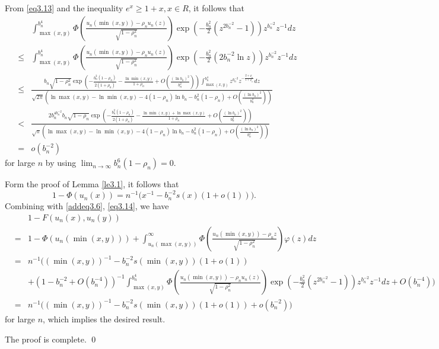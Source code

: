 \documentclass[10pt,twosided]{article}
\numberwithin{equation}{section}
\numberwithin{equation}{section}
\begin{document}
From \eqref{eq3.13} and the inequality $e^{x}\geq 1+x, x\in R$, it follows that
\begin{eqnarray}\label{eq3.14}
& & \int_{\max(x,y)}^{b_{n}^{4}} \Phi\left( \frac{u_{n}(\min(x,y))-\rho_{n}u_{n}(z)}{\sqrt{1-\rho_{n}^{2}}} \right)
\exp\left( -\frac{b_{n}^{2}}{2} (z^{2b_n^{-2}}-1)\right)z^{b_{n}^{-2}}z^{-1}dz \nonumber \\
&\leq& \int_{\max(x,y)}^{b_{n}^{4}} \Phi\left( \frac{u_{n}(\min(x,y))-\rho_{n}u_{n}(z)}{\sqrt{1-\rho_{n}^{2}}} \right)
\exp\left( -\frac{b_{n}^{2}}{2}(2b_{n}^{-2}\ln z) \right) z^{b_{n}^{-2}}z^{-1}dz\nonumber\\
&\le& \frac{b_{n}\sqrt{1-\rho_{n}^2}\exp\left(-\frac{b_n^2(1-\rho_n)}{2(1+\rho_n)} -\frac{\ln \min(x,y)}{1+\rho_n} +O\left( \frac{(\ln b_{n})^2}{b_{n}^2} \right) \right) \int_{\max(x,y)}^{b_{n}^{4}} z^{b_{n}^{-2}}z^{-\frac{2+\rho_{n}}{1+\rho_{n}}}dz}
{\sqrt{2\pi}\left(  \ln \max(x,y)-\ln \min(x,y) - 4(1-\rho_{n})\ln b_{n}
-b_{n}^2(1-\rho_{n}) + O\left( \frac{(\ln b_{n})^2}{b_{n}^2}  \right)\right)}
\nonumber \\
&<& \frac{2b_{n}^{4b_{n}^{-2}} b_{n}\sqrt{1-\rho_{n}}\exp\left(-\frac{b_n^2(1-\rho_n)}{2(1+\rho_n)}
-\frac{\ln \min(x,y) + \ln \max(x,y)}{1+\rho_n} +O\left( \frac{(\ln b_{n})^2}{b_{n}^2} \right) \right)  }
{\sqrt{\pi}\left(  \ln \max(x,y)-\ln \min(x,y) - 4(1-\rho_{n})\ln b_{n}
-b_{n}^2(1-\rho_{n}) + O\left( \frac{(\ln b_{n})^2}{b_{n}^2}  \right)\right)} \nonumber \\
&=& o\left( b_{n}^{-2} \right)
\end{eqnarray}
for large $n$ by using $\lim_{n\to \infty} b_{n}^{6}(1-\rho_{n})=0$.

Form the proof of Lemma \ref{le3.1}, it follows that
\[1-\Phi(u_{n}(x))=n^{-1}\Big( x^{-1} -b_{n}^{-2}s(x)(1+o(1)) \Big).\]
Combining with \eqref{addeq3.6}, \eqref{eq3.14}, we have
\begin{eqnarray}
& & 1-F(u_{n}(x),u_{n}(y))\nonumber \\
&=& 1-\Phi\left( u_{n}(\min(x,y)) \right) + \int_{u_{n}(\max(x,y))}^{\infty}
\Phi\left( \frac{u_{n}(\min(x,y))-\rho_{n}z}{\sqrt{1-\rho_{n}^{2}}}\right)\varphi(z)dz  \nonumber \\
&=& n^{-1}\Big( (\min(x,y))^{-1} -b_{n}^{-2}s(\min(x,y))(1+o(1))   \nonumber \\
& & + \left( 1-b_{n}^{-2} + O(b_{n}^{-4}) \right)^{-1}\int_{\max(x,y)}^{b_{n}^{4}}
\Phi\left( \frac{u_{n}(\min(x,y))-\rho_{n}u_{n}(z) }{\sqrt{1-\rho_{n}^{2}}} \right)
\exp\left( -\frac{b_{n}^{2}}{2}\left( z^{2b_{n}^{-2}} -1 \right) \right)z^{b_{n}^{-2}}z^{-1}dz +O(b_{n}^{-4})  \Big) \nonumber \\
&=& n^{-1}\Big( (\min(x,y))^{-1} -b_{n}^{-2}s(\min(x,y))(1+o(1)) + o(b_{n}^{-2})  \Big)
\end{eqnarray}
for large $n$, which implies the desired result.

The proof is complete. \qed
\end{document}
